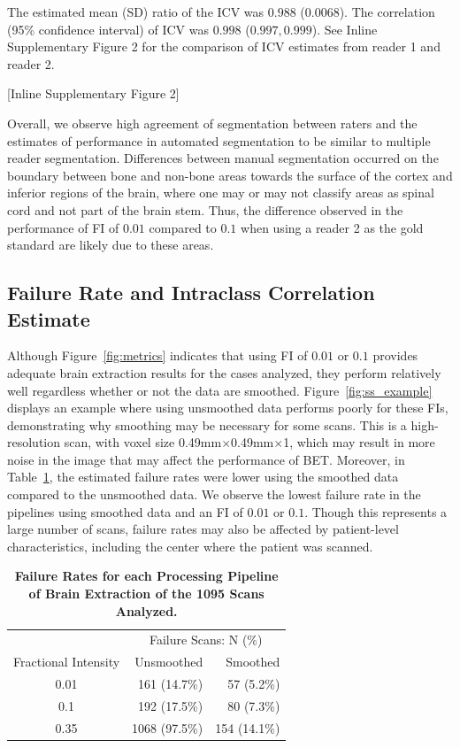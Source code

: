 \documentclass{elsarticle}\usepackage[]{graphicx}\usepackage[]{color}
\begin{document}
The estimated mean (SD) ratio of the ICV was $0.988$ ($0.0068$).  The correlation (95\% confidence interval) of ICV was $0.998$ ($0.997, 0.999$).  See Inline Supplementary Figure 2 for the comparison of ICV estimates from reader 1 and reader 2.

[Inline Supplementary Figure 2]


Overall, we observe high agreement of segmentation between raters and the estimates of performance in automated segmentation to be similar to multiple reader segmentation.  Differences between manual segmentation occurred on the boundary between bone and non-bone areas towards the surface of the cortex and inferior regions of the brain, where one may or may not classify areas as spinal cord and not part of the brain stem.  Thus, the difference observed in the performance of FI of $0.01$ compared to $0.1$ when using a reader 2 as the gold standard are likely due to these areas.  


\subsection{Failure Rate and Intraclass Correlation Estimate}
Although Figure~\ref{fig:metrics} indicates that using FI of $0.01$ or $0.1$ provides adequate brain extraction results for the cases analyzed, they perform relatively well regardless whether or not the data are smoothed.  Figure~\ref{fig:ss_example} displays an example where using unsmoothed data performs poorly for these FIs, demonstrating why smoothing may be necessary for some scans.  This is a high-resolution scan, with voxel size 0.49mm$\times$0.49mm$\times$1, which may result in more noise in the image that may affect the performance of BET.  Moreover, in Table~\ref{tab:fail}, the estimated failure rates were lower using the smoothed data compared to the unsmoothed data.  We observe the lowest failure rate in the pipelines using smoothed data and an FI of $0.01$ or $0.1$.  Though this represents a large number of scans, failure rates may also be affected by patient-level characteristics, including the center where the patient was scanned.  

\begin{table}[ht]
\centering
\begin{tabular}{cr|r}
  \hline & \multicolumn{2}{c}{Failure Scans: N (\%)} \\Fractional Intensity & Unsmoothed & Smoothed \\ 
  \hline
0.01 & 161 (14.7\%) & 57 (5.2\%) \\ 
  0.1 & 192 (17.5\%) & 80 (7.3\%) \\ 
  0.35 & 1068 (97.5\%) & 154 (14.1\%) \\ 
   \hline
\end{tabular}
\caption{{\bf Failure Rates for each Processing Pipeline of Brain Extraction of the 1095 Scans Analyzed.}} 
\label{tab:fail}
\end{table}
\end{document}
